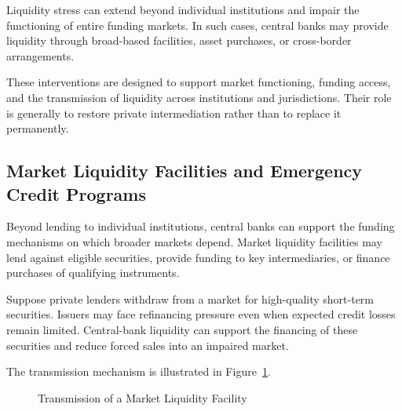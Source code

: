 Liquidity stress can extend beyond individual institutions and impair the functioning of entire funding markets. In such cases, central banks may provide liquidity through broad-based facilities, asset purchases, or cross-border arrangements.

These interventions are designed to support market functioning, funding access, and the transmission of liquidity across institutions and jurisdictions. Their role is generally to restore private intermediation rather than to replace it permanently.

\subsection{Market Liquidity Facilities and Emergency Credit Programs}

Beyond lending to individual institutions, central banks can support the funding mechanisms on which broader markets depend. Market liquidity facilities may lend against eligible securities, provide funding to key intermediaries, or finance purchases of qualifying instruments.

Suppose private lenders withdraw from a market for high-quality short-term securities. Issuers may face refinancing pressure even when expected credit losses remain limited. Central-bank liquidity can support the financing of these securities and reduce forced sales into an impaired market.

The transmission mechanism is illustrated in Figure~\ref{fig:ch22-market-liquidity-transmission}.

\begin{figure}[htbp]
\centering
{}
\caption{Transmission of a Market Liquidity Facility}
\label{fig:ch22-market-liquidity-transmission}
\end{figure}

